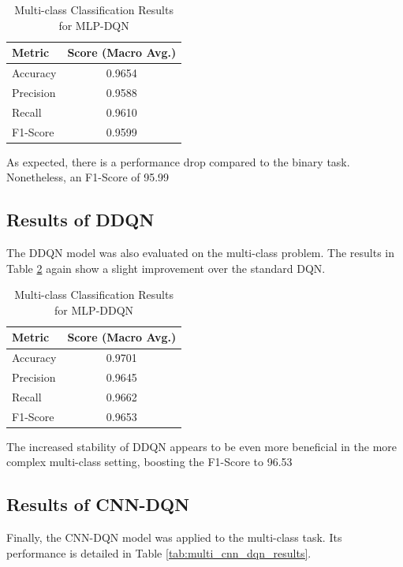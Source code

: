 \documentclass{report}
\begin{document}
\begin{table}[H]
    \centering
    \caption{Multi-class Classification Results for MLP-DQN}
    \label{tab:multi_dqn_results}
    \begin{tabular}{@{}lc@{}}
        \toprule
        \textbf{Metric} & \textbf{Score (Macro Avg.)} \\
        \midrule
        Accuracy & 0.9654 \\
        Precision & 0.9588 \\
        Recall & 0.9610 \\
        F1-Score & 0.9599 \\
        \bottomrule
    \end{tabular}
\end{table}

As expected, there is a performance drop compared to the binary task. Nonetheless, an F1-Score of 95.99%

\subsection{Results of DDQN}
The DDQN model was also evaluated on the multi-class problem. The results in Table \ref{tab:multi_ddqn_results} again show a slight improvement over the standard DQN.

\begin{table}[H]
    \centering
    \caption{Multi-class Classification Results for MLP-DDQN}
    \label{tab:multi_ddqn_results}
    \begin{tabular}{@{}lc@{}}
        \toprule
        \textbf{Metric} & \textbf{Score (Macro Avg.)} \\
        \midrule
        Accuracy & 0.9701 \\
        Precision & 0.9645 \\
        Recall & 0.9662 \\
        F1-Score & 0.9653 \\
        \bottomrule
    \end{tabular}
\end{table}

The increased stability of DDQN appears to be even more beneficial in the more complex multi-class setting, boosting the F1-Score to 96.53%

\subsection{Results of CNN-DQN}
Finally, the CNN-DQN model was applied to the multi-class task. Its performance is detailed in Table \ref{tab:multi_cnn_dqn_results}.
\end{document}
